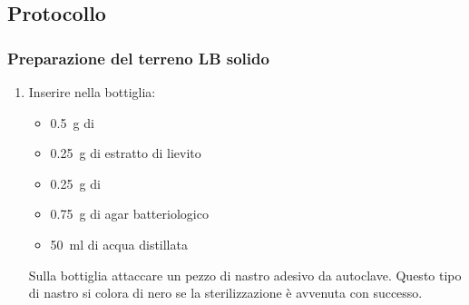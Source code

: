 \subsection{Protocollo}
\subsubsection{Preparazione del terreno LB solido}
\begin{enumerate}
	\item Inserire nella bottiglia:
	      \begin{itemize}[person]
		      \item \qty{0.5}{\g} di 
		      \item \qty{0.25}{\g} di estratto di lievito
		      \item \qty{0.25}{\g} di 
		      \item \qty{0.75}{\g} di agar batteriologico
		      \item \qty{50}{\ml} di acqua distillata
	      \end{itemize}
	      \begin{Note}
		      Sulla bottiglia attaccare un pezzo di nastro adesivo da autoclave. Questo tipo di nastro si colora di nero se la sterilizzazione è avvenuta con successo.
	      \end{Note}


\end{enumerate}

